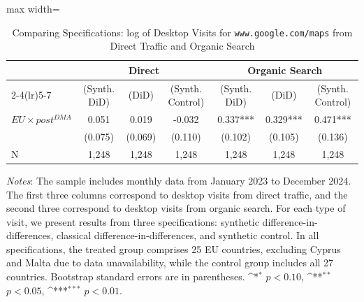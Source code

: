 \documentclass[11pt]{article}
\begin{document}
	
	
	
	
	\clearpage
	
	\begin{table}[ht!]
		\centering
		\def\sym#1{\ifmmode^{#1}\else\(^{#1}\)\fi}
		\caption{\label{tab:sdid_traffic_organic} Comparing Specifications: log of Desktop Visits for \texttt{www.google.com/maps} from Direct Traffic and Organic Search}
		\begin{threeparttable}
			\begin{adjustbox}{max width=\linewidth}
				\begin{tabular}{lcccccc}
					\hline \noalign{\smallskip} 
					& \multicolumn{3}{c}{Direct} & \multicolumn{3}{c}{Organic Search}  \\ \cmidrule(lr){2-4}\cmidrule(lr){5-7}
				
				&(Synth. DiD)   &       (DiD)   &(Synth. Control)   &(Synth. DiD)   &       (DiD)   &(Synth. Control)   \\
				\midrule
				$ EU \times post^{DMA} $ &       0.051   &       0.019   &      -0.032   &       0.337***&       0.329***&       0.471***\\
				&     (0.075)   &     (0.069)   &     (0.110)   &     (0.102)   &     (0.105)   &     (0.136)   \\
				
				N                   &       1,248   &       1,248   &       1,248   &       1,248   &       1,248   &       1,248   \\
				\midrule
				\end{tabular}
			\end{adjustbox}
			\begin{tablenotes}
				\item \footnotesize \emph{Notes}: The sample includes monthly data from January 2023 to December 2024. The first three columns correspond to desktop visits from direct traffic, and the second three correspond to desktop visits from organic search. For each type of visit, we present results from three specifications: synthetic difference-in-differences, classical difference-in-differences, and synthetic control. In all specifications, the treated group comprises 25 EU countries, excluding Cyprus and Malta due to data unavailability, while the control group includes all 27 countries. Bootstrap standard errors are in parentheses. \sym{*} \(p<0.10\), \sym{**} \(p<0.05\), \sym{***}  \(p<0.01\). 
			\end{tablenotes}
		\end{threeparttable}
	\end{table}
	
\end{document}
